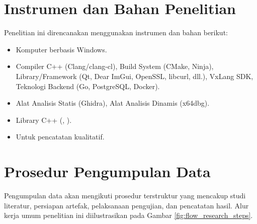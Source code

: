 \section{Instrumen dan Bahan Penelitian}
Penelitian ini direncanakan menggunakan instrumen dan bahan berikut:
\begin{itemize}
    \item {} Komputer berbasis Windows.
    \item {} Compiler C++ (Clang/clang-cl), Build System (CMake, Ninja), Library/Framework (Qt, Dear ImGui, OpenSSL, libcurl, dll.), VxLang SDK, Teknologi Backend (Go, PostgreSQL, Docker).
    \item {} Alat Analisis Statis (Ghidra), Alat Analisis Dinamis (x64dbg).
    \item {} Library C++ (, ).
    \item {} Untuk pencatatan kualitatif.
\end{itemize}

\section{Prosedur Pengumpulan Data}
Pengumpulan data akan mengikuti prosedur terstruktur yang mencakup studi literatur, persiapan artefak, pelaksanaan pengujian, dan pencatatan hasil. Alur kerja umum penelitian ini diilustrasikan pada Gambar \ref{fig:flow_research_steps}.

